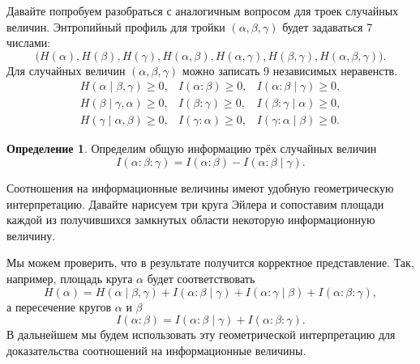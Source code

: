 \documentclass[12pt]{article}
\theoremstyle{definition}
\newtheorem{definition}{Определение}[section]
\theoremstyle{plain}
\theoremstyle{remark}
\begin{document}
Давайте попробуем разобраться с аналогичным вопросом для троек случайных
величин. Энтропийный профиль для тройки $(\alpha,\beta,\gamma)$ будет задаваться 7 числами:
\[
\bigl(H(\alpha),H(\beta),H(\gamma),H(\alpha,\beta),H(\alpha,\gamma),
H(\beta,\gamma),H(\alpha,\beta,\gamma)\bigr).
\]
Для случайных величин $(\alpha,\beta,\gamma)$ можно записать 9 независимых
неравенств.
\begin{equation*}
\begin{array}{lll}
H(\alpha\mid\beta,\gamma)\ge 0, & I(\alpha:\beta )\ge 0, & I(\alpha:\beta\mid\gamma) \ge 0,\\
H(\beta\mid\gamma,\alpha)\ge 0, & I(\beta:\gamma )\ge 0, & I(\beta:\gamma\mid\alpha) \ge 0,\\
H(\gamma\mid\alpha,\beta)\ge 0, & I(\gamma:\alpha)\ge 0, & I(\gamma:\alpha\mid\beta) \ge 0.
\end{array}
\end{equation*}
\begin{definition}
Определим общую информацию трёх случайных величин
\[
    I(\alpha:\beta:\gamma) = I(\alpha:\beta) - I(\alpha:\beta\mid\gamma).
\]
\end{definition}

Соотношения на информационные величины имеют удобную геометрическую интерпретацию. Давайте нарисуем три круга Эйлера и сопоставим площади каждой из получившихся замкнутых области некоторую информационную величину.
    \begin{center}
    \end{center}
Мы можем проверить, что в результате получится корректное представление. Так, например, площадь круга $\alpha$ будет соответствовать 
\[
H(\alpha) = H(\alpha\mid \beta,\gamma) + I(\alpha:\beta\mid\gamma)
+ I(\alpha:\gamma\mid\beta) + I(\alpha:\beta:\gamma),
\]
а пересечение кругов $\alpha$ и $\beta$
\[
I(\alpha : \beta) = I(\alpha:\beta\mid\gamma) + I(\alpha:\beta:\gamma).
\]
В дальнейшем мы будем использовать эту геометрической интерпретацию для доказательства
соотношений на информационные величины.
\end{document}
